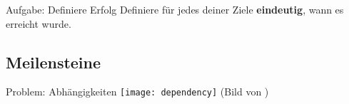 \begin{frame}[c]%
    \begin{block}{Aufgabe: Definiere Erfolg}
        Definiere für jedes deiner Ziele \textbf{eindeutig}, wann es erreicht wurde.
    \end{block}
\end{frame}

%
%
%


\subsection{Meilensteine}


\begin{frame}[c]{Problem: Abhängigkeiten}
    \normalsize
    \texttt{[image: dependency]}
    (Bild von \cite{dependency-pic})
\end{frame}



